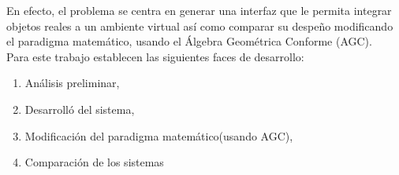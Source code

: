 En efecto, el problema se centra en generar una interfaz que le permita integrar objetos reales a un ambiente virtual así como comparar su despeño modificando el paradigma matemático, usando el Álgebra Geométrica Conforme (AGC).\\

Para este trabajo establecen las siguientes faces de desarrollo:

\begin{enumerate}
	\item Análisis preliminar,
	\item Desarrolló del sistema,
	\item Modificación del paradigma matemático(usando AGC),
	\item Comparación de los sistemas
\end{enumerate}







